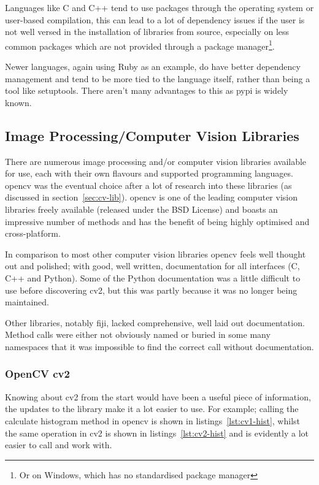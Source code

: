 Languages like C and C++ tend to use packages through the operating system or user-based 
compilation, this can lead to a lot of dependency issues if the user is not well versed in the
installation of libraries from source, especially on less common packages which are not provided
through a package manager\footnote{Or on Windows, which has no standardised package manager}.

Newer languages, again using Ruby as an example, do have better dependency management and tend to
be more tied to the language itself, rather than being a tool like setuptools. There aren't
many advantages to this as \gls{pypi} is widely known.


\subsection{Image Processing/Computer Vision Libraries}
There are numerous image processing and/or computer vision libraries available for use, each with
their own flavours and supported programming languages. \gls{opencv} was the eventual choice after a lot
of research into these libraries (as discussed in section~\ref{sec:cv-lib}). \gls{opencv} is one
of the leading computer vision libraries freely available (released under the BSD License) and 
boasts an impressive number of methods and has the benefit of being highly optimised and 
cross-platform.

In comparison to most other computer vision libraries \gls{opencv} feels well thought out and 
polished; with good, well written, documentation for all interfaces (C, C++ and Python). Some of
the Python documentation was a little difficult to use before discovering \gls{cv2}, but this was 
partly because it was no longer being maintained.

Other libraries, notably \gls{fiji}, lacked comprehensive, well laid out documentation. Method 
calls were either not obviously named or buried in some many namespaces that it was impossible to
find the correct call without documentation.


\subsubsection{OpenCV cv2}
Knowing about \gls{cv2} from the start would have been a useful piece of information, the
updates to the library make it a lot easier to use. For example; calling the calculate histogram
method in \gls{opencv} is shown in listings~\ref{lst:cv1-hist}, whilst the same operation in 
\gls{cv2} is shown in listings~\ref{lst:cv2-hist} and is evidently a lot easier to call
and work with.



